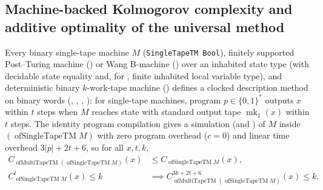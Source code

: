 \begin{result}
\subsection{Machine-backed Kolmogorov complexity and additive optimality of the universal method}
Every binary single-tape machine $M$ (\texttt{SingleTapeTM Bool}), finitely
supported Post--Turing machine () or Wang B-machine () over
an inhabited state type (with decidable state equality and, for , finite
inhabited local variable type), and deterministic binary $k$-work-tape machine
() defines a clocked description method on binary words
(, , , ): for
single-tape machines, program $p\in\{0,1\}^*$ outputs $x$ within $t$ steps when
$M$ reaches state  with standard output tape $\operatorname{mk}_1(x)$
within $t$ steps. The identity program compilation gives a simulation
 (and ) of  $M$
inside  $(\operatorname{ofSingleTapeTM} M)$ with zero program
overhead ($c=0$) and linear time overhead $3|p|+2t+6$, so for all $x,t,k$,
\[
\begin{aligned}
C_{\operatorname{ofMultiTapeTM}(\operatorname{ofSingleTapeTM} M)}(x)
  &\le C_{\operatorname{ofSingleTapeTM} M}(x),\\
C_{\operatorname{ofSingleTapeTM} M}^{t}(x)\le k
  &\implies
C_{\operatorname{ofMultiTapeTM}(\operatorname{ofSingleTapeTM} M)}^{3k+2t+6}(x)
  \le k.
\end{aligned}
\]


\end{result}
